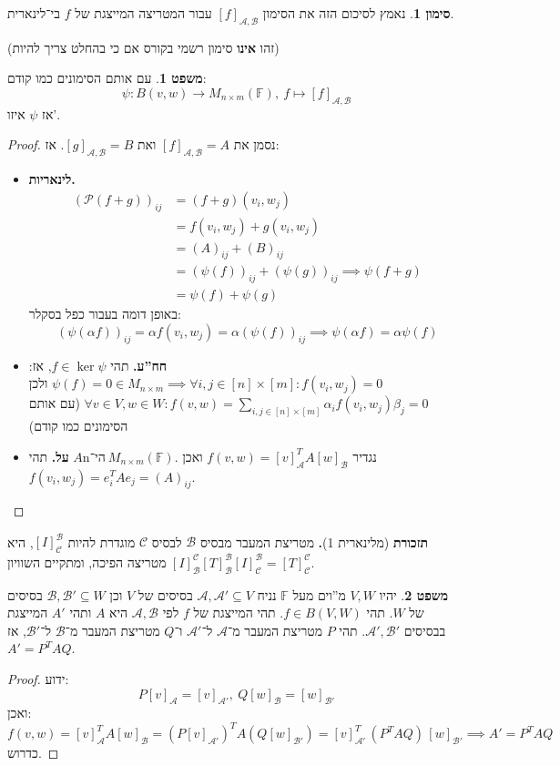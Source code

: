 \documentclass[a4paper]{article}
\newcommand\ps    {\mathcal{P}}
\newcommand\ac    {\mathcal{A}}
\newcommand\bc    {\mathcal{B}}
\newcommand\cc    {\mathcal{C}}
\newcommand\n     {$n$־יה\ }
\newcommand\F         {\mathbb{F}}
\newcommand\co        {\colon}
\newcommand\ag        {\alpha}
\newcommand\bg        {\beta}
\theoremstyle{definition}
\newtheorem{Theorem}{\color{myblue}משפט}
\newtheorem{Notion}{\color{myred}סימון}
\newcommand\theo  [1] {\begin{Theorem}#1\end{Theorem}}
\newcommand\noti  [1] {\begin{Notion}#1\end{Notion}}
\begin{document}
	
	\noti{נאמץ לסיכום הזה את הסימון $[f]_{\ac, \bc}$ עבור המטריצה המייצגת של $f$ בי־לינארית. }
	(זהו \textbf{אינו} סימון רשמי בקורס אם כי בהחלט צריך להיות)
	\theo{עם אותם הסימונים כמו קודם: 
		\[ \psi \co B(v, w) \to M_{n \times m}(\F), \ f \mapsto [f]_{\ac, \bc} \]
		אז $\psi$ איזו'. }
	\begin{proof}
		נסמן את $[f]_{\ac, \bc} = A$ ואת $[g]_{\ac, \bc} = B$. אז: 
		\begin{itemize}
			\item \textbf{לינאריות. }
			\begin{align*}
				(\ps(f + g))_{ij} &= (f + g)(v_i, w_j) \\
				&= f(v_i, w_j) + g(v_i, w_j) \\
				&= (A)_{ij} + (B)_{ij} \\
				&= (\psi(f))_{ij} + (\psi(g))_{ij} \implies \psi(f + g) \\
				&= \psi(f) + \psi(g)
			\end{align*}
			באופן דומה בעבור כפל בסקלר: 
			\[ (\psi(\ag f))_{ij} = \ag f(v_i, w_j) = \ag (\psi(f))_{ij} \implies \psi(\ag f) = \ag \psi(f) \]
			\item \textbf{חח''ע. }תהי $f \in \ker \psi$, אז: $\psi(f) = 0 \in M_{n \times m} \implies \forall i,j \in [n] \times [m]\co f(v_i, w_j) = 0$ ולכן $\forall v \in V, w \in W \co f(v, w) = \sum_{{i, j \in [n] \times [m]}}\ag_i f(v_i, w_j)\bg_j = 0$
			(עם אותם הסימונים כמו קודם)
			\item \textbf{על. }תהי $A \n M_{n \times m}(\F)$. נגדיר $f(v, w) = [v]_\ac^T A[w]_\bc$ ואכן $f(v_i, w_j) = e_i^T A e_j = (A)_{ij}$. 
		\end{itemize}
	\end{proof}
	
	
	\textbf{תזכורת }(מלינארית 1)\textbf{. }מטריצת המעבר מבסיס $\bc$ לבסיס $\cc$ מוגדרת להיות $[I]^{\bc}_{\cc}$, היא מטריצה הפיכה, ומתקיים השוויון $[I]^{\cc}_{\bc}[T]^{\bc}_{\bc}[I]^{\bc}_{\cc} = [T]^{\cc}_{\cc}$. 
	\theo{יהיו $V, W$ מ''וים מעל $\F$ נניח $\ac, \ac' \subseteq V$ בסיסים של $V$ וכן $\bc, \bc' \subseteq W$ בסיסים של $W$. תהי $f \in B(V, W)$. 
		תהי המייצגת של $f$ לפי $\ac, \bc$ היא $A$ ותהי $A'$ המייצגת בבסיסים $\ac', \bc'$. תהי $P$ מטריצת המעבר מ־$\ac$ ל־$\ac'$ ו־$Q$ מטריצת המעבר מ־$\bc$ ל־$\bc'$, אז $A' = P^T AQ$. 
	}
	\begin{proof}
		ידוע: 
		\[ P[v]_{\ac} = [v]_{\ac'}, \ Q[w]_\bc = [w]_{\bc'} \]
		ואכן: 
		\[ f(v, w) = [v]_{\ac}^T A [w]_\bc = (P[v]_{\ac '})^TA(Q[w]_{\bc'}) = [v]_{\ac'}^T \, (P^T A Q) \, [w]_{\bc'} \implies A' = P^T A Q \]
		כדרוש. 
	\end{proof}
	
\end{document}
